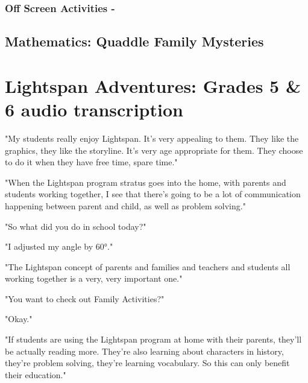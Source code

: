 \subsubsection{Off Screen Activities - }

\subsection{Mathematics: Quaddle Family Mysteries}

\section{Lightspan Adventures: Grades 5 \& 6 audio transcription}

"My students really enjoy Lightspan.
It's very appealing to them.
They like the graphics, they like the storyline.
It's very age appropriate for them.
They choose to do it when they have free time, spare time."

"When the Lightspan program stratus goes into the home, with parents and students working together, I see that there's going to be a lot of communication happening between parent and child, as well as problem solving."

"So what did you do in school today?"

"I adjusted my angle by 60°."

"The Lightspan concept of parents and families and teachers and students all working together is a very, very important one."

"You want to check out Family Activities?"

"Okay."

"If students are using the Lightspan program at home with their parents, they'll be actually reading more.
They're also learning about characters in history, they're problem solving, they're learning vocabulary.
So this can only benefit their education."